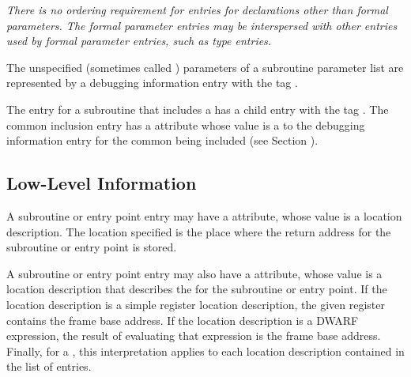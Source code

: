 \textit{There is no ordering requirement for entries for declarations
other than formal parameters. The formal parameter
entries may be interspersed with other entries used by formal
parameter entries, such as type entries.}

The unspecified (sometimes called ) 
parameters of a subroutine parameter list are
represented by a debugging information 
entry
with the tag \DWTAGunspecifiedparametersTARG.

The entry for a subroutine that includes a
has a child entry with the 
tag \DWTAGcommoninclusionTARG. 
The
\hypertarget{chap:commonreferencecommonblockusage}{}
common inclusion entry has a 
\DWATcommonreferenceDEFN{} attribute
whose value is a  
to the debugging information entry
for the common  being included 
(see Section ).

\subsection{Low-Level Information}
\label{chap:lowlevelinformation}

A 
\hypertarget{chap:DWATreturnaddrsubroutinereturnaddresssavelocation}{}
subroutine or entry point entry may have a 
\DWATreturnaddrDEFN{}
attribute, whose value is a location description. The location
specified is the place where the return address for the
subroutine or entry point is stored.

A 
\hypertarget{chap:DWATframebasesubroutineframebaseaddress}{}
subroutine or entry point entry may also have 
a
\DWATframebaseDEFN{} attribute, whose value is a location
description that describes the  for the
subroutine or entry point. If the location description is
a simple register location description, the given register
contains the frame base address. If the location description is
a DWARF expression, the result of evaluating that expression
is the frame base address. Finally, for a 
,
this interpretation applies to each location description
contained in the list of  entries.

